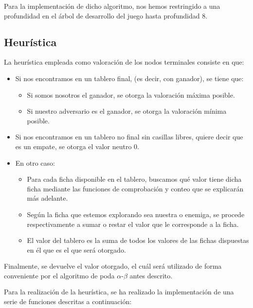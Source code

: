 \documentclass[a4paper, 11pt]{article}
\begin{document}
		Para la implementación de dicho algoritmo, nos hemos restringido a una profundidad en el
		árbol de desarrollo del juego hasta profundidad 8.
		
	\subsection{Heurística}\label{sec: h(x)}
		La heurística empleada como valoración de los nodos terminales consiste en que:
		\begin{itemize}
			\item Si nos encontramos en un tablero final, (es decir, con ganador), se tiene que:
			\begin{itemize}
				\item Si somos nosotros el ganador, se otorga la valoración máxima posible.
				\item Si nuestro adversario es el ganador, se otorga la valoración mínima posible.
			\end{itemize}
			
			\item Si nos encontramos en un tablero no final sin casillas libres, quiere decir que
			es un empate, se otorga el valor neutro 0.
			
			\item En otro caso:
				\begin{itemize}
					\item Para cada ficha disponible en el tablero, buscamos qué valor tiene dicha
					ficha mediante las funciones de comprobación y conteo que se explicarán más
					adelante.
					
					\item Según la ficha que estemos explorando sea nuestra o enemiga, se procede
					respectivamente a sumar o restar el valor que le corresponde a la ficha.
					
					\item El valor del tablero es la suma de todos los valores de las fichas
					dispuestas en él que es el que será otorgado.
				\end{itemize}
										
		\end{itemize}

		Finalmente, se devuelve el valor otorgado, el cuál será utilizado de forma conveniente
		por el algoritmo de poda $\alpha$-$\beta$ antes descrito.
	
		Para la realización de la heurística, se ha realizado la implementación de una serie de
		funciones descritas a continuación:
\end{document}
